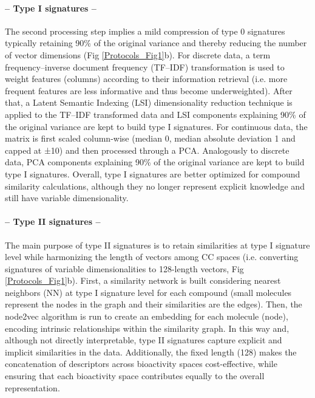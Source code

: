 \paragraph{-- Type I signatures --} \leavevmode

The second processing step implies a mild compression of type 0 signatures typically retaining 90\% of the original variance and thereby reducing the number of vector dimensions (Fig \ref{Protocols_Fig1}b). For discrete data, a term frequency–inverse document frequency (TF–IDF) transformation is used to weight features (columns) according to their information retrieval (i.e. more frequent features are less informative and thus become underweighted). After that, a Latent Semantic Indexing (LSI) dimensionality reduction technique is applied to the TF–IDF transformed data and LSI components explaining 90\% of the original variance are kept to build type I signatures. For continuous data, the matrix is first scaled column-wise (median 0, median absolute deviation 1 and capped at ±10) and then processed through a PCA. Analogously to discrete data, PCA components explaining 90\% of the original variance are kept to build type I signatures. Overall, type I signatures are better optimized for compound similarity calculations, although they no longer represent explicit knowledge and still have variable dimensionality.  

\paragraph{-- Type II signatures --} \leavevmode

The main purpose of type II signatures is to retain similarities at type I signature level while harmonizing the length of vectors among CC spaces (i.e. converting signatures of variable dimensionalities to 128-length vectors, Fig \ref{Protocols_Fig1}b). First, a similarity network is built considering nearest neighbors (NN) at type I signature level for each compound (small molecules represent the nodes in the graph and their similarities are the edges). Then, the node2vec algorithm is run to create an embedding for each molecule (node), encoding intrinsic relationships within the similarity graph. In this way and, although not directly interpretable, type II signatures capture explicit and implicit similarities in the data. Additionally, the fixed length (128) makes the concatenation of descriptors across bioactivity spaces cost-effective, while ensuring that each bioactivity space contributes equally to the overall representation.  



